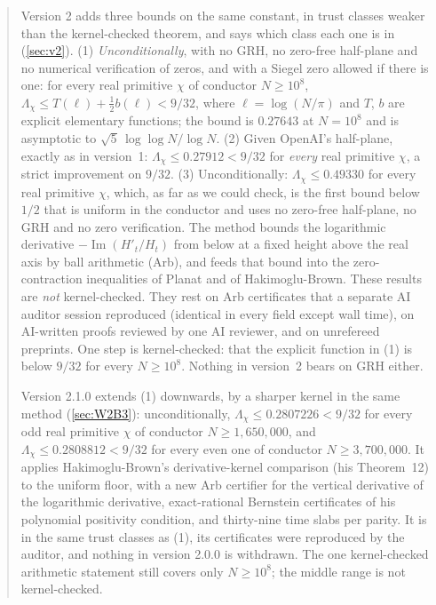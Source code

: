 \documentclass[11pt]{article}
\theoremstyle{definition}
\newcommand{\im}{\operatorname{Im}}
\newcommand{\Lc}{\Lambda}
\begin{document}
\begin{abstract}
Version 2 adds three bounds on the same constant, in trust classes weaker than the kernel-checked theorem, and says which class each one is in (\cref{sec:v2}). (1) \emph{Unconditionally}, with no GRH, no zero-free half-plane and no numerical verification of zeros, and with a Siegel zero allowed if there is one: for every real primitive $\chi$ of conductor $N \ge 10^8$, $\Lc_\chi \le T(\ell) + \tfrac12 b(\ell) < 9/32$, where $\ell = \log(N/\pi)$ and $T$, $b$ are explicit elementary functions; the bound is $0.27643$ at $N = 10^8$ and is asymptotic to $\sqrt5\,\log\log N/\log N$. (2) Given OpenAI's half-plane, exactly as in version~1: $\Lc_\chi \le 0.27912 < 9/32$ for \emph{every} real primitive $\chi$, a strict improvement on $9/32$. (3) Unconditionally: $\Lc_\chi \le 0.49330$ for every real primitive $\chi$, which, as far as we could check, is the first bound below $1/2$ that is uniform in the conductor and uses no zero-free half-plane, no GRH and no zero verification. The method bounds the logarithmic derivative $-\im(H'_t/H_t)$ from below at a fixed height above the real axis by ball arithmetic (Arb), and feeds that bound into the zero-contraction inequalities of Planat and of Hakimoglu-Brown. These results are \emph{not} kernel-checked. They rest on Arb certificates that a separate AI auditor session reproduced (identical in every field except wall time), on AI-written proofs reviewed by one AI reviewer, and on unrefereed preprints. One step is kernel-checked: that the explicit function in (1) is below $9/32$ for every $N \ge 10^8$. Nothing in version~2 bears on GRH either.

Version 2.1.0 extends (1) downwards, by a sharper kernel in the same method (\cref{sec:W2B3}): unconditionally, $\Lc_\chi \le 0.2807226 < 9/32$ for every odd real primitive $\chi$ of conductor $N \ge 1{,}650{,}000$, and $\Lc_\chi \le 0.2808812 < 9/32$ for every even one of conductor $N \ge 3{,}700{,}000$. It applies Hakimoglu-Brown's derivative-kernel comparison (his Theorem~12) to the uniform floor, with a new Arb certifier for the vertical derivative of the logarithmic derivative, exact-rational Bernstein certificates of his polynomial positivity condition, and thirty-nine time slabs per parity. It is in the same trust classes as (1), its certificates were reproduced by the auditor, and nothing in version 2.0.0 is withdrawn. The one kernel-checked arithmetic statement still covers only $N \ge 10^8$; the middle range is not kernel-checked.
\end{abstract}

\tableofcontents
\end{document}
